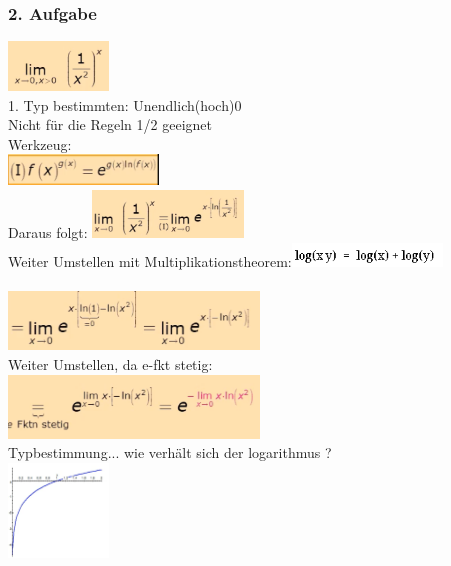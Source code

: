 \documentclass[12pt,a4paper]{article}
\begin{document}
\subsubsection{2. Aufgabe}
\includegraphics[width=0.2\textwidth]{Bilder/S1/7.png}\\
1. Typ bestimmten: Unendlich(hoch)0\\
Nicht für die Regeln 1/2 geeignet\\
Werkzeug:\\
\includegraphics[width=0.3\textwidth]{Bilder/S1/3.png}\\
Daraus folgt:
\includegraphics[width=0.3\textwidth]{Bilder/S1/8.png}\\
Weiter Umstellen mit Multiplikationstheorem:\includegraphics[width=0.3\textwidth]{Bilder/S1/10.png}\\\\
\includegraphics[width=0.5\textwidth]{Bilder/S1/9.png}\\
Weiter Umstellen, da e-fkt stetig:\\
\includegraphics[width=0.5\textwidth]{Bilder/S1/11.png}\\
Typbestimmung... wie verhält sich der logarithmus ?\\
\includegraphics[width=0.2\textwidth]{Bilder/S1/12.png}\\
\end{document}
